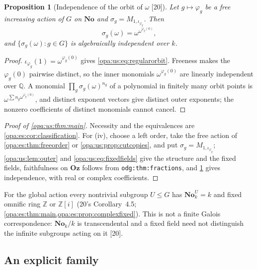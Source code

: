 \documentclass[11pt,oneside]{article}
\numberwithin{equation}{section}
\newtheorem{proposition}[proposition]{Proposition}
\theoremstyle{definition}
\theoremstyle{remark}
\newcommand{\No}{\mathbf{No}}
\newcommand{\Oz}{\mathbf{Oz}}
\newcommand{\Q}{\mathbb Q}
\newcommand{\Z}{\mathbb Z}
\newcommand{\src}[1]{\textup{\textsf{\small[#1]}}}
\newcommand{\lbl}[1]{\nolinkurl{#1}}
\begin{document}
\begin{proposition}[Independence of the orbit of $\omega$ \src{20}]\label{opa:us:prop:orbitindep}
Let $g\mapsto\varphi_g$ be a free increasing action of $G$ on $\No$ and $\sigma_g=M_{1,\iota_{\varphi_g}}$. Then
\begin{equation}\label{opa:us:eq:regularorbit}
 \sigma_g(\omega)=\omega^{\omega^{\varphi_g(0)}},
\end{equation}
and $\{\sigma_g(\omega):g\in G\}$ is algebraically independent over $k$.
\end{proposition}
\begin{proof}
$\iota_{\varphi_g}(1)=\omega^{\varphi_g(0)}$ gives \eqref{opa:us:eq:regularorbit}. Freeness makes the $\varphi_g(0)$ pairwise distinct, so the inner
monomials $\omega^{\varphi_g(0)}$ are linearly independent over $\Q$. A monomial $\prod_g\sigma_g(\omega)^{n_g}$ of a polynomial in finitely many
orbit points is $\omega^{\sum n_g\omega^{\varphi_g(0)}}$, and distinct exponent vectors give distinct outer exponents; the nonzero coefficients
of distinct monomials cannot cancel.
\end{proof}

\begin{proof}[Proof of \cref{opa:us:thm:main}]
Necessity and the equivalences are \cref{opa:es:cor:classification}. For (iv), choose a left order, take the free action of
\cref{opa:es:thm:freeorder} or \cref{opa:us:prop:cutcopies}, and put $\sigma_g=M_{1,\iota_{\varphi_g}}$; \cref{opa:us:lem:outer} and
\eqref{opa:us:eq:fixedfields} give the structure and the fixed fields, faithfulness on $\Oz$ follows from \lbl{odg:thm:fractions}, and
\cref{opa:us:prop:orbitindep} gives independence, with real or complex coefficients.
\end{proof}

For the global action every nontrivial subgroup $U\le G$ has $\No_k^U=k$ and fixed omnific ring $\Z$ or $\Z[i]$ (20's Corollary~4.5;
\cref{opa:es:thm:main,opa:es:prop:complexfixed}). This is not a finite Galois correspondence: $\No_k/k$ is transcendental and a fixed field
need not distinguish the infinite subgroups acting on it \src{20}.

\subsection{An explicit family}
\end{document}
